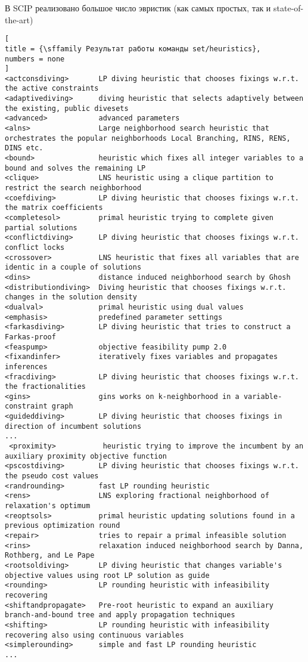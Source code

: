 \documentclass[%
	11pt,
	a4paper,
	utf8,
		]{article}
\begin{document}
В SCIP реализовано большое число эвристик (как самых простых, так и state-of-the-art)
\begin{lstlisting}[
title = {\sffamily Результат работы команды set/heuristics},
numbers = none
]
<actconsdiving>       LP diving heuristic that chooses fixings w.r.t. the active constraints
<adaptivediving>      diving heuristic that selects adaptively between the existing, public divesets
<advanced>            advanced parameters
<alns>                Large neighborhood search heuristic that orchestrates the popular neighborhoods Local Branching, RINS, RENS, DINS etc.
<bound>               heuristic which fixes all integer variables to a bound and solves the remaining LP
<clique>              LNS heuristic using a clique partition to restrict the search neighborhood
<coefdiving>          LP diving heuristic that chooses fixings w.r.t. the matrix coefficients
<completesol>         primal heuristic trying to complete given partial solutions
<conflictdiving>      LP diving heuristic that chooses fixings w.r.t. conflict locks
<crossover>           LNS heuristic that fixes all variables that are identic in a couple of solutions
<dins>                distance induced neighborhood search by Ghosh
<distributiondiving>  Diving heuristic that chooses fixings w.r.t. changes in the solution density
<dualval>             primal heuristic using dual values
<emphasis>            predefined parameter settings
<farkasdiving>        LP diving heuristic that tries to construct a Farkas-proof
<feaspump>            objective feasibility pump 2.0
<fixandinfer>         iteratively fixes variables and propagates inferences
<fracdiving>          LP diving heuristic that chooses fixings w.r.t. the fractionalities
<gins>                gins works on k-neighborhood in a variable-constraint graph
<guideddiving>        LP diving heuristic that chooses fixings in direction of incumbent solutions
...
 <proximity>           heuristic trying to improve the incumbent by an auxiliary proximity objective function
<pscostdiving>        LP diving heuristic that chooses fixings w.r.t. the pseudo cost values
<randrounding>        fast LP rounding heuristic
<rens>                LNS exploring fractional neighborhood of relaxation's optimum
<reoptsols>           primal heuristic updating solutions found in a previous optimization round
<repair>              tries to repair a primal infeasible solution
<rins>                relaxation induced neighborhood search by Danna, Rothberg, and Le Pape
<rootsoldiving>       LP diving heuristic that changes variable's objective values using root LP solution as guide
<rounding>            LP rounding heuristic with infeasibility recovering
<shiftandpropagate>   Pre-root heuristic to expand an auxiliary branch-and-bound tree and apply propagation techniques
<shifting>            LP rounding heuristic with infeasibility recovering also using continuous variables
<simplerounding>      simple and fast LP rounding heuristic
...
\end{lstlisting}
\end{document}
